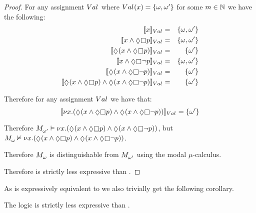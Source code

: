 \begin{proof}
For any assignment $\kAssignment$ where $\kAssignment(\varX) = \{\omega, \omega'\}$ for some $m \in \mathbb{N}$ we have the following:
\begin{eqnarray*}
    \interpretation[\kAssignment]{\varX} &=& \{\omega, \omega'\}\\
    \interpretation[\kAssignment]{\varX \land \possible \necessary \atomP} &=& \{\omega, \omega'\}\\
    \interpretation[\kAssignment]{\possible (\varX \land \possible \necessary \atomP)} &=& \{\omega'\}\\
    \interpretation[\kAssignment]{\varX \land \possible \necessary \neg \atomP} &=& \{\omega, \omega'\}\\
    \interpretation[\kAssignment]{\possible (\varX \land \possible \necessary \neg \atomP)} &=& \{\omega'\}\\
    \interpretation[\kAssignment]{\possible (\varX \land \possible \necessary \atomP) \land \possible (\varX \land \possible \necessary \neg \atomP)} &=& \{\omega'\}
\end{eqnarray*}

Therefore for any assignment $\kAssignment$ we have that: $$\interpretation[\kAssignment]{\gfp{\varX} (\possible (\varX \land \possible \necessary \atomP) \land \possible (\varX \land \possible \necessary \neg \atomP))} = \{\omega'\}$$

Therefore $\kPModel{\omega'} \entails \gfp{\varX} (\possible (\varX \land \possible \necessary \atomP) \land \possible (\varX \land \possible \necessary \neg \atomP))$, 
but $\kPModel{\omega} \nentails \gfp{\varX} (\possible (\varX \land \possible \necessary \atomP) \land \possible (\varX \land \possible \necessary \neg \atomP))$.

Therefore $\kPModel{\omega}$ is distinguishable from $\kPModel{\omega'}$ using the modal $\mu$-calculus.

Therefore \logicRmlKF{} is strictly less expressive than \logicMuKF{}.
\end{proof}

As \logicMuKF{} is expressively equivalent to \logicBqmlKF{} we also trivially get the following corollary. 

\begin{corollary}
The logic \logicRmlKF{} is strictly less expressive than \logicBqmlKF{}.
\end{corollary}
